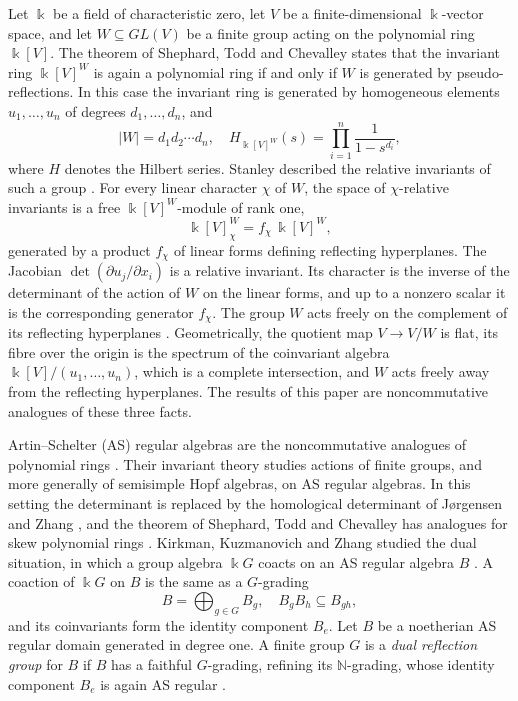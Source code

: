 \documentclass[reqno]{amsart}
\numberwithin{equation}{section}
\theoremstyle{definition}
\theoremstyle{remark}
\theoremstyle{plain}
\newcommand{\kk}{\Bbbk}
\begin{document}
Let $\kk$ be a field of characteristic zero, let $V$ be a finite-dimensional $\kk$-vector space, and let $W\subseteq GL(V)$ be a finite group acting on the polynomial ring $\kk[V]$. The theorem of Shephard, Todd and Chevalley \cite{ST,Che} states that the invariant ring $\kk[V]^W$ is again a polynomial ring if and only if $W$ is generated by pseudo-reflections. In this case the invariant ring is generated by homogeneous elements $u_1,\dots,u_n$ of degrees $d_1,\dots,d_n$, and
\begin{equation}\label{YAMq1Ab3}
|W|=d_1d_2\cdots d_n,\quad H_{\kk[V]^W}(s)=\prod_{i=1}^n\frac1{1-s^{d_i}},
\end{equation}
where $H$ denotes the Hilbert series. Stanley described the relative invariants of such a group \cite[Theorems 2.3 and 3.1]{Sta}. For every linear character $\chi$ of $W$, the space of $\chi$-relative invariants is a free $\kk[V]^W$-module of rank one,
\begin{equation}\label{YAMq2Bc4}
\kk[V]^W_\chi=f_\chi\,\kk[V]^W,
\end{equation}
generated by a product $f_\chi$ of linear forms defining reflecting hyperplanes. The Jacobian $\det(\partial u_j/\partial x_i)$ is a relative invariant. Its character is the inverse of the determinant of the action of $W$ on the linear forms, and up to a nonzero scalar it is the corresponding generator $f_\chi$. The group $W$ acts freely on the complement of its reflecting hyperplanes \cite[Theorem 1.5]{Ste}. Geometrically, the quotient map $V\to V/W$ is flat, its fibre over the origin is the spectrum of the coinvariant algebra $\kk[V]/(u_1,\dots,u_n)$, which is a complete intersection, and $W$ acts freely away from the reflecting hyperplanes. The results of this paper are noncommutative analogues of these three facts.

Artin--Schelter (AS) regular algebras are the noncommutative analogues of polynomial rings \cite{AS}. Their invariant theory studies actions of finite groups, and more generally of semisimple Hopf algebras, on AS regular algebras. In this setting the determinant is replaced by the homological determinant of J{\o}rgensen and Zhang \cite{JZ}, and the theorem of Shephard, Todd and Chevalley has analogues for skew polynomial rings \cite{KKZ0}. Kirkman, Kuzmanovich and Zhang studied the dual situation, in which a group algebra $\kk G$ coacts on an AS regular algebra $B$ \cite{KKZ}. A coaction of $\kk G$ on $B$ is the same as a $G$-grading
\[
B=\bigoplus_{g\in G}B_g,\quad B_gB_h\subseteq B_{gh},
\]
and its coinvariants form the identity component $B_e$. Let $B$ be a noetherian AS regular domain generated in degree one. A finite group $G$ is a \emph{dual reflection group} for $B$ if $B$ has a faithful $G$-grading, refining its $\mathbb N$-grading, whose identity component $B_e$ is again AS regular \cite[Definition 0.1]{KKZ}.
\end{document}
